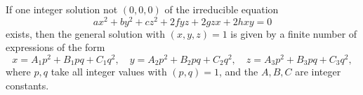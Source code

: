 \begin{proposition}
If one integer solution not $(0,0,0)$ of the irreducible equation
\[
    ax^2+by^2+cz^2+2fyz+2gzx+2hxy=0
\]
exists, then the general solution with $(x,y,z)=1$ is given by a finite number of
expressions of the form
\[
    x=A_1p^2+B_1pq+C_1q^2,\quad
    y=A_2p^2+B_2pq+C_2q^2,\quad
    z=A_3p^2+B_3pq+C_3q^2,
\]
where $p,q$ take all integer values with $(p,q)=1$, and the $A,B,C$ are integer
constants.
\end{proposition}
